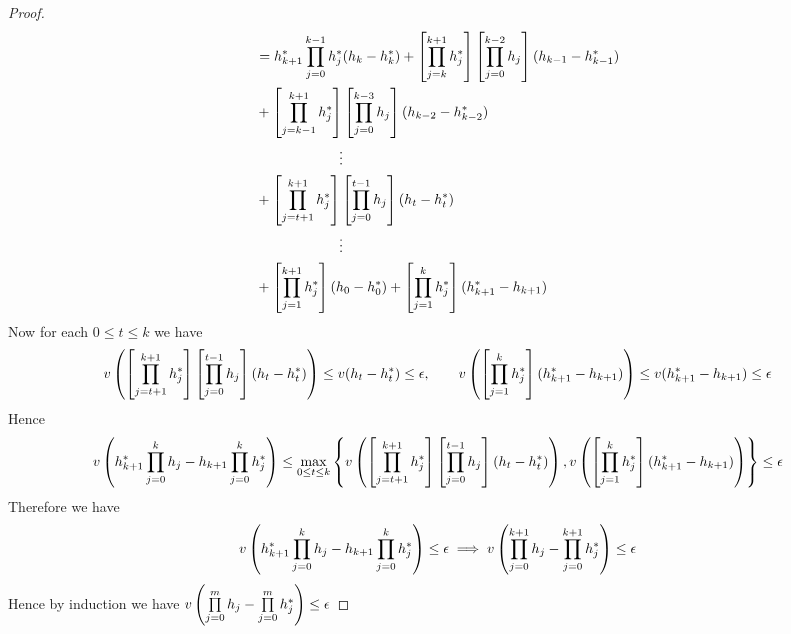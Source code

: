 \begin{proof}
\begin{align*}
		 & = h_{k+1}^*\prod_{j=0}^{k-1}h_j^*(h_{k}-h_k^*)+\left[\prod_{j=k}^{k+1}h_j^*\right]\left[\prod_{j=0}^{k-2}h_j  \right](h_{k-1}-h_{k-1}^*) \\
		 & +\left[\prod_{j=k-1}^{k+1}h_j^*\right]\left[\prod_{j=0}^{k-3}h_j  \right](h_{k-2}-h_{k-2}^*)\\
		 & \qquad\qquad\qquad\vdots\\
		 & +\left[\prod_{j=t+1}^{k+1}h_j^*\right]\left[\prod_{j=0}^{t-1}h_j  \right](h_{t}-h_{t}^*)\\
		  & \qquad\qquad\qquad\vdots\\
		  & + \left[\prod_{j=1}^{k+1}h_j^*\right](h_0-h_0^*)+  \left[\prod_{j=1}^{k}h_j^*\right](h_{k+1}^*-h_{k+1})
	\end{align*}
	Now for each $0\leq t\leq k$ we have $$v\left(  \left[\prod_{j=t+1}^{k+1}h_j^*\right]\left[\prod_{j=0}^{t-1}h_j  \right](h_{t}-h_{t}^*)\right)\leq v(h_t-h_t^*)\leq\epsilon, \qquad v\left(  \left[\prod_{j=1}^{k}h_j^*\right](h_{k+1}^*-h_{k+1})  \right)\leq v(h_{k+1}^*-h_{k+1})\leq \epsilon$$Hence $$v\left( h_{k+1}^*\prod\limits_{j=0}^kh_j-h_{k+1}\prod\limits_{j=0}^{k}h_j^*  \right)\leq \max_{0\leq t\leq k}\left\{  v\left(  \left[\prod_{j=t+1}^{k+1}h_j^*\right]\left[\prod_{j=0}^{t-1}h_j  \right](h_{t}-h_{t}^*)\right),  v\left(  \left[\prod_{j=1}^{k}h_j^*\right](h_{k+1}^*-h_{k+1})  \right)\right\}\leq \epsilon$$Therefore we have  $$ v\left( h_{k+1}^*\prod\limits_{j=0}^kh_j-h_{k+1}\prod\limits_{j=0}^{k}h_j^*  \right)  \leq \epsilon\implies 	v\left(  \prod_{j=0}^{k+1}h_j-\prod_{j=0}^{k+1}h_j^* \right)\leq \epsilon$$Hence by induction we have $	v\left(  \prod\limits_{j=0}^{m}h_j-\prod\limits_{j=0}^{m}h_j^* \right)\leq \epsilon$
\end{proof}



